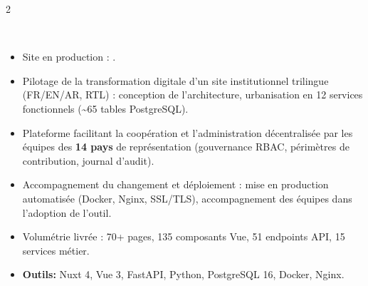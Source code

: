 \documentclass[10pt,a4paper,ragged2e,withhyper]{altacv}
\begin{document}
\begin{paracol}{2}
             \\

             \\


        \switchcolumn




            \begin{itemize}
                \item Site en production : .
                \item Pilotage de la transformation digitale d'un site institutionnel trilingue (FR/EN/AR, RTL) : conception de l'architecture, urbanisation en 12 services fonctionnels (\textasciitilde65 tables PostgreSQL).
                \item Plateforme facilitant la coopération et l'administration décentralisée par les équipes des \textbf{14 pays} de représentation (gouvernance RBAC, périmètres de contribution, journal d'audit).
                \item Accompagnement du changement et déploiement : mise en production automatisée (Docker, Nginx, SSL/TLS), accompagnement des équipes dans l'adoption de l'outil.
                \item Volumétrie livrée : 70+ pages, 135 composants Vue, 51 endpoints API, 15 services métier.
                \item \textcolor{SecondaryColor}{\textbf{Outils: }} Nuxt 4, Vue 3, FastAPI, Python, PostgreSQL 16, Docker, Nginx.
            \end{itemize}
            \divider


\end{paracol}
\end{document}
